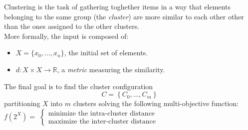 Clustering is the task of gathering toghether items in a way that elements belonging
to the same group (the \emph{cluster}) are more similar to each other other than the ones
assigned to the other clusters.\\
More formally, the input is composed of:
\begin{itemize}
    \item $X = \{x_0, \dots ,x_n\}$, the initial set of elements.
    \item $d: X \times X \to \mathbb{R}$, a \emph{metric} measuring the similarity.
\end{itemize}
The final goal is to find the cluster configuration
\begin{equation*}
    C = \left\{ C_0, \dots , C_m \right\}
\end{equation*}
partitioning $X$
into $m$ clusters solving the following multi-objective function:\\

$f\left(2^X\right) =$
\begin{math}
    \left\{
        \begin{array}{l}
            \text{minimize the intra-cluster distance}
            \\
            \text{maximize the inter-cluster distance}
        \end{array}
    \right.
\end{math}
